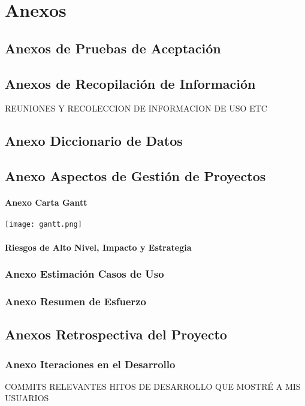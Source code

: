 \chapter{Anexos}

\section{Anexos de Pruebas de Aceptación}

\section{Anexos de Recopilación de Información}
REUNIONES Y RECOLECCION DE INFORMACION DE USO ETC

\section{Anexo Diccionario de Datos}

\section{Anexo Aspectos de Gestión de Proyectos}

\subsubsection{Anexo Carta Gantt}

\texttt{[image: gantt.png]}

\subsubsection{Riesgos de Alto Nivel, Impacto y Estrategia}
	
\subsection{Anexo Estimación Casos de Uso}

\subsection{Anexo Resumen de Esfuerzo}
 

\section{Anexos Retrospectiva del Proyecto}

\subsection{Anexo Iteraciones en el Desarrollo}

COMMITS RELEVANTES HITOS DE DESARROLLO QUE MOSTRÉ A MIS USUARIOS